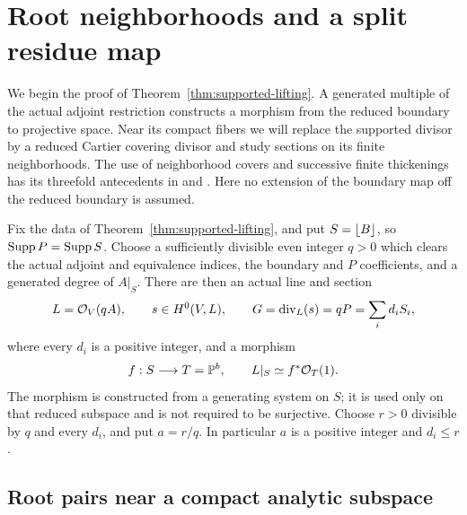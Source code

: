 \section{Root neighborhoods and a split residue map}\label{sec:covers}

We begin the proof of Theorem~\ref{thm:supported-lifting}.  A generated
multiple of the actual adjoint restriction constructs a morphism from
the reduced boundary to projective space.  Near its compact fibers we
will replace the supported divisor by a reduced Cartier covering divisor
and study sections on its finite neighborhoods.  The use of neighborhood
covers and successive finite thickenings has its threefold antecedents in
\cite[Sections~1--2 and~4]{Miyaoka1988} and
\cite[Section~4]{Kawamata1992}.  Here no extension of the boundary map
off the reduced boundary is assumed.

Fix the data of Theorem~\ref{thm:supported-lifting}, and put
\(S=\left\lfloor B\right\rfloor\), so \(\operatorname{Supp} P=\operatorname{Supp} S\).  Choose a sufficiently divisible even integer
\(q>0\) which clears the actual adjoint and equivalence indices, the
boundary and \(P\) coefficients, and a generated degree of \(A|_S\).
There are then an actual line and section
\begin{equation}\label{eq:lifting-data}
 L=\mathcal O_V(qA),\qquad s\in H^0(V,L),\qquad
 G=\operatorname{div}_L(s)=qP=\sum_i d_iS_i,
\end{equation}
where every \(d_i\) is a positive integer, and a morphism
\begin{equation}\label{eq:boundary-map}
 f:S\longrightarrow T=\mathbb P^b,\qquad L|_S\simeq f^*\mathcal O_T(1).
\end{equation}
The morphism is constructed from a generating system on \(S\); it is
used only on that reduced subspace and is not required to be surjective.
Choose \(r>0\) divisible by \(q\) and
every \(d_i\), and put \(a=r/q\).  In particular \(a\) is a positive
integer and \(d_i\leq r\).

\subsection{Root pairs near a compact analytic subspace}


